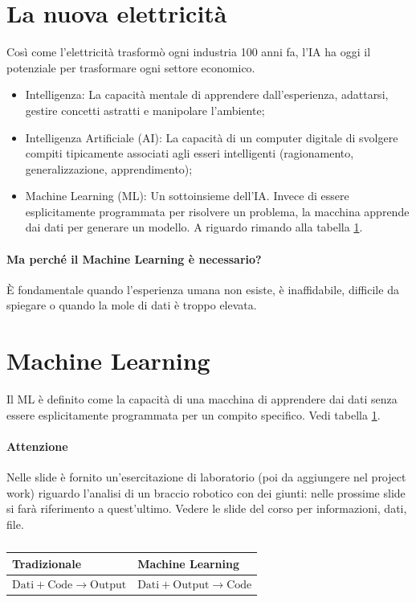 %

%
\section{La nuova elettricità}
Così come l'elettricità trasformò ogni industria 100 anni fa, l'IA ha oggi il potenziale per trasformare ogni settore economico.
\begin{itemize}
    \item Intelligenza: La capacità mentale di apprendere dall'esperienza, adattarsi, gestire concetti astratti e manipolare l'ambiente;
    \item Intelligenza Artificiale (AI): La capacità di un computer digitale di svolgere compiti tipicamente associati agli esseri intelligenti (ragionamento, generalizzazione, apprendimento);
    \item Machine Learning (ML): Un sottoinsieme dell'IA. Invece di essere esplicitamente programmata per risolvere un problema, la macchina apprende dai dati per generare un modello. A riguardo rimando alla tabella \ref{tab:07-ml}.
\end{itemize}
%
\paragraph{Ma perché il Machine Learning è necessario?} È fondamentale quando l'esperienza umana non esiste, è inaffidabile, difficile da spiegare o quando la mole di dati è troppo elevata.

%
\section{Machine Learning}
Il ML è definito come la capacità di una macchina di apprendere dai dati senza essere esplicitamente programmata per un compito specifico. Vedi tabella \ref{tab:07-ml}.
\paragraph{Attenzione} Nelle slide è fornito un'esercitazione di laboratorio (poi da aggiungere nel project work) riguardo l'analisi di un braccio robotico con dei giunti: nelle prossime slide si farà riferimento a quest'ultimo. Vedere le slide del corso per informazioni, dati, file.

\begin{table}
    \centering
    \begin{tabular}{ll}%
        \toprule
        \textbf{Tradizionale}                           & \textbf{Machine Learning}                  \\
        \midrule
        $ \text{Dati} + \text{Code} \to \text{Output} $ & $ \text{Dati}+\text{Output}\to\text{Code}$ \\
        \bottomrule
    \end{tabular}
    \caption{}\label{tab:07-ml}
\end{table}

